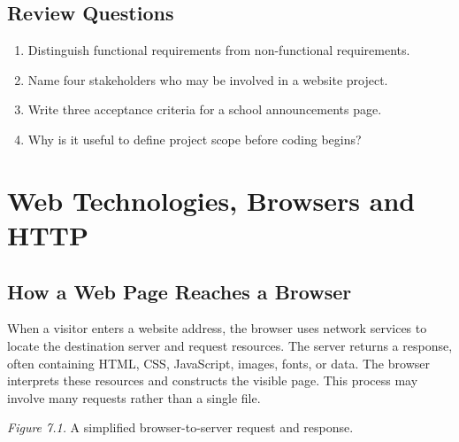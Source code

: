 \documentclass[11pt,openany,oneside]{book}
\begin{document}
\section*{Review Questions}
\begin{enumerate}
\item Distinguish functional requirements from non-functional requirements.
\item Name four stakeholders who may be involved in a website project.
\item Write three acceptance criteria for a school announcements page.
\item Why is it useful to define project scope before coding begins?
\end{enumerate}

\chapter{Web Technologies, Browsers and HTTP}
\section{How a Web Page Reaches a Browser}
When a visitor enters a website address, the browser uses network services to locate the destination server and request resources. The server returns a response, often containing HTML, CSS, JavaScript, images, fonts, or data. The browser interprets these resources and constructs the visible page. This process may involve many requests rather than a single file.

\begin{center}
\end{center}
\textit{Figure 7.1.} A simplified browser-to-server request and response.
\end{document}
